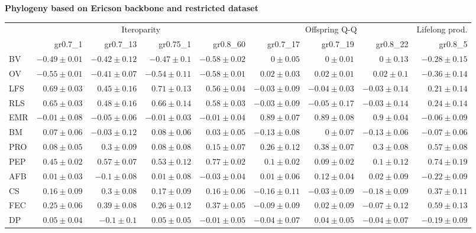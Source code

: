 \begin{landscape}
\begin{table}
\begin{footnotesize}
\textbf{Phylogeny based on Ericson backbone and restricted dataset}

\begin{tabular}{@{}l|rrrr|rrr|r@{}}
\toprule
 & \multicolumn{4}{c|}{Iteroparity} & \multicolumn{3}{c|}{Offspring Q-Q} & \multicolumn{1}{c}{Lifelong prod.}\\
 & gr0.7\_1 & gr0.7\_13 & gr0.75\_1 & gr0.8\_60 & gr0.7\_17 & gr0.7\_19 & gr0.8\_22 & gr0.8\_5\\
\midrule
BV & $-0.49 \pm 0.01$ & $-0.42 \pm 0.12$ & $-0.47 \pm 0.1$ & $-0.58 \pm 0.02$ & $0 \pm 0.05$ & $0 \pm 0.01$ & $0 \pm 0.13$ & $-0.28 \pm 0.15$\\
OV & $-0.55 \pm 0.01$ & $-0.41 \pm 0.07$ & $-0.54 \pm 0.11$ & $-0.58 \pm 0.01$ & $0.02 \pm 0.03$ & $0.02 \pm 0.01$ & $0.02 \pm 0.1$ & $-0.36 \pm 0.14$\\
LFS & $0.69 \pm 0.03$ & $0.45 \pm 0.16$ & $0.71 \pm 0.13$ & $0.56 \pm 0.04$ & $-0.03 \pm 0.09$ & $-0.04 \pm 0.03$ & $-0.03 \pm 0.14$ & $0.21 \pm 0.14$\\
RLS & $0.65 \pm 0.03$ & $0.48 \pm 0.16$ & $0.66 \pm 0.14$ & $0.58 \pm 0.03$ & $-0.03 \pm 0.09$ & $-0.05 \pm 0.17$ & $-0.03 \pm 0.14$ & $0.24 \pm 0.14$\\
EMR & $-0.01 \pm 0.08$ & $-0.05 \pm 0.06$ & $-0.01 \pm 0.03$ & $-0.01 \pm 0.04$ & $0.89 \pm 0.07$ & $0.89 \pm 0.08$ & $0.9 \pm 0.04$ & $-0.06 \pm 0.09$\\
BM & $0.07 \pm 0.06$ & $-0.03 \pm 0.12$ & $0.08 \pm 0.06$ & $0.03 \pm 0.05$ & $-0.13 \pm 0.08$ & $0 \pm 0.07$ & $-0.13 \pm 0.06$ & $-0.07 \pm 0.06$\\
PRO & $0.08 \pm 0.05$ & $0.3 \pm 0.09$ & $0.08 \pm 0.08$ & $0.15 \pm 0.07$ & $0.26 \pm 0.12$ & $0.38 \pm 0.07$ & $0.3 \pm 0.08$ & $0.57 \pm 0.08$\\
PEP & $0.45 \pm 0.02$ & $0.57 \pm 0.07$ & $0.53 \pm 0.12$ & $0.77 \pm 0.02$ & $0.1 \pm 0.02$ & $0.09 \pm 0.02$ & $0.1 \pm 0.12$ & $0.74 \pm 0.19$\\
AFB & $0.01 \pm 0.03$ & $-0.1 \pm 0.08$ & $0.01 \pm 0.08$ & $-0.03 \pm 0.04$ & $0.01 \pm 0.06$ & $0.12 \pm 0.04$ & $0.02 \pm 0.09$ & $-0.22 \pm 0.09$\\
CS & $0.16 \pm 0.09$ & $0.3 \pm 0.08$ & $0.17 \pm 0.09$ & $0.16 \pm 0.06$ & $-0.16 \pm 0.11$ & $-0.03 \pm 0.09$ & $-0.18 \pm 0.09$ & $0.37 \pm 0.11$\\
FEC & $0.25 \pm 0.06$ & $0.39 \pm 0.08$ & $0.26 \pm 0.12$ & $0.37 \pm 0.05$ & $-0.09 \pm 0.09$ & $0.02 \pm 0.09$ & $-0.07 \pm 0.12$ & $0.59 \pm 0.13$\\
DP & $0.05 \pm 0.04$ & $-0.1 \pm 0.1$ & $0.05 \pm 0.05$ & $-0.01 \pm 0.05$ & $-0.04 \pm 0.07$ & $0.04 \pm 0.05$ & $-0.04 \pm 0.07$ & $-0.19 \pm 0.09$\\

\end{tabular}
\end{footnotesize}
\end{table}
\end{landscape}
